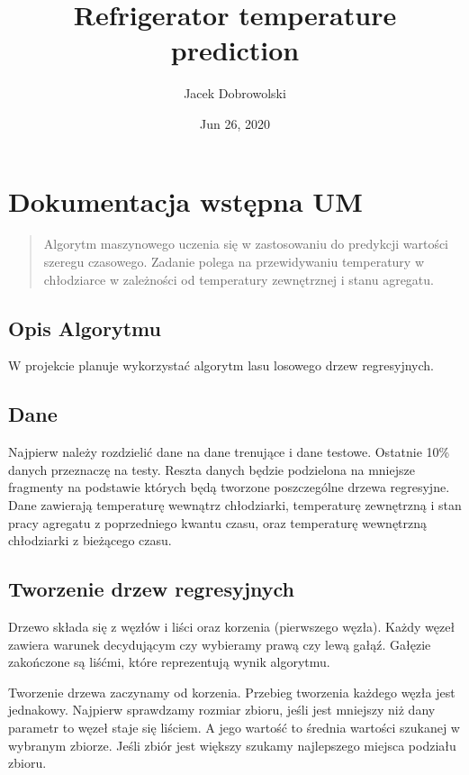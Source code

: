 \documentclass[letterpaper,10pt,english]{sphinxmanual}
\title{Refrigerator temperature prediction}
\date{Jun 26, 2020}
\author{Jacek Dobrowolski}
\begin{document}
\pagestyle{empty}
\sphinxmaketitle
\pagestyle{plain}
\sphinxtableofcontents
\pagestyle{normal}
\label{\detokenize{index::doc}}



\chapter{Dokumentacja wstępna UM}
\label{\detokenize{dok_wstepna:dokumentacja-wstepna-um}}\label{\detokenize{dok_wstepna::doc}}\begin{quote}

 Algorytm maszynowego uczenia się w zastosowaniu do predykcji
wartości szeregu czasowego. Zadanie polega na przewidywaniu temperatury
w chłodziarce w zależności od temperatury zewnętrznej i stanu agregatu.
\end{quote}


\section{Opis Algorytmu}
\label{\detokenize{dok_wstepna:opis-algorytmu}}
W projekcie planuje wykorzystać algorytm lasu losowego drzew
regresyjnych.


\section{Dane}
\label{\detokenize{dok_wstepna:dane}}
Najpierw należy rozdzielić dane na dane trenujące i dane testowe.
Ostatnie 10\% danych przeznaczę na testy. Reszta danych będzie podzielona
na mniejsze fragmenty na podstawie których będą tworzone poszczególne
drzewa regresyjne. Dane zawierają temperaturę wewnątrz chłodziarki,
temperaturę zewnętrzną i stan pracy agregatu z poprzedniego kwantu
czasu, oraz temperaturę wewnętrzną chłodziarki z bieżącego czasu.


\section{Tworzenie drzew regresyjnych}
\label{\detokenize{dok_wstepna:tworzenie-drzew-regresyjnych}}
Drzewo składa się z węzłów i liści oraz korzenia (pierwszego węzła).
Każdy węzeł zawiera warunek decydującym czy wybieramy prawą czy lewą
gałąź. Gałęzie zakończone są liśćmi, które reprezentują wynik algorytmu.

Tworzenie drzewa zaczynamy od korzenia. Przebieg tworzenia każdego węzła
jest jednakowy. Najpierw sprawdzamy rozmiar zbioru, jeśli jest mniejszy
niż dany parametr to węzeł staje się liściem. A jego wartość to średnia
wartości szukanej w wybranym zbiorze. Jeśli zbiór jest większy szukamy
najlepszego miejsca podziału zbioru.
\end{document}
